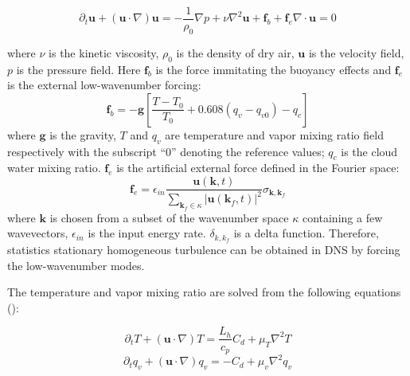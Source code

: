 \documentclass[draft,jgrga]{AGUTeX}
\begin{document}
\begin{article}
\begin{subequations}

\begin{equation}
\partial_{t}\mathbf{u}+(\mathbf{u}\cdot\nabla)\mathbf{u}=-\frac{1}{\rho_{0}}\nabla p+\nu\nabla^2 \mathbf{u}+\mathbf{f}_b + \mathbf{f}_e\label{eq:NS1}
\end{equation}


\begin{equation}
\nabla\cdot \mathbf{u}=0\label{eq:NS2}
\end{equation}

\end{subequations}

where $\nu$ is the kinetic viscosity, $\rho_{0}$ is the density of
dry air, $\mathbf{u}$ is the velocity field, $p$ is the pressure field. Here $\mathbf{f}_b$ is the force immitating the buoyancy effects and $\mathbf{f}_e$ is the external low-wavenumber forcing:
\begin{equation}
\mathbf{f}_b= 
-\mathbf{g}[\frac{T-T_{0}}{T_0}+0.608(q_{v}-q_{v0})-q_{c}]
\label{eq:source_term}
\end{equation}
where $\mathbf{g}$ is the gravity, $T$ and $q_{v}$ are temperature
and vapor mixing ratio field respectively with the subscript ``$0$''
denoting the reference values; $q_{c}$ is the cloud water mixing
ratio. $\mathbf{f}_e$ is the artificial external force defined in the Fourier space:
\begin{equation}
\mathbf{f}_e = \epsilon_{in}\frac{\mathbf{u}(\mathbf{k},t)}
{\sum_{\mathbf{k}_f\in \kappa}|\mathbf{u}(\mathbf{k}_f,t)|^2}
\sigma_{\mathbf{k},\mathbf{k}_f}
\end{equation}
where $\mathbf{k}$ is chosen from a subset of the wavenumber space $\kappa$ containing a few wavevectors, $\epsilon_{in}$ is the input energy rate. $\delta_{k,k_f}$ is a delta function. Therefore, statistics stationary homogeneous turbulence 
can be obtained in DNS by forcing the low-wavenumber modes.

The temperature and vapor mixing ratio are solved from the following
equations (\cite{Kumar11}):

\begin{equation}
\partial_{t}T+(\mathbf{u}\cdot\nabla)T=\frac{L_{h}}{c_{p}}C_{d}+\mu_{T}\nabla^{2}T\label{eq:Temp}
\end{equation}
\begin{equation}
\partial_{t}q_{v}+(\mathbf{u}\cdot\nabla)q_{v}=-C_{d}+\mu_{v}\nabla^{2}q_{v}\label{eq:Vapor}
\end{equation}



\end{article}
\end{document}
